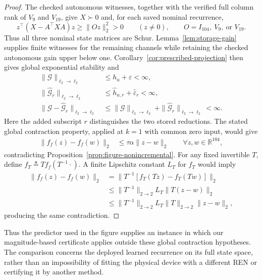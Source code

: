 \documentclass{l4dc2027}
\newcommand{\R}{\mathbb R}
\newcommand{\eqdef}{\triangleq}
\begin{document}
\begin{proof}
The checked autonomous witnesses, together with the verified full column rank of \mbox{$V_9$} and \mbox{$V_{19}$}, give \mbox{$X\succ0$} and, for each saved nominal recurrence,
\[
 z^\top(X-A^\top XA)z\ge\|Oz\|_2^2>0
 \qquad(z\ne0),\qquad O=I_{104},\ V_9,\ \text{or }V_{19}.
\]
Thus all three nominal state matrices are Schur.
Lemma~\ref{lem:storage-gain} supplies finite witnesses for the remaining channels while retaining the checked autonomous gain upper below one.
Corollary~\ref{cor:prescribed-projection} then gives global exponential stability and
\[
 \begin{aligned}
 \|\mathcal G\|_{\ell_2\to\ell_2}&\le h_u+\varepsilon<\infty,\\
 \|\widehat{\mathcal G}_r\|_{\ell_2\to\ell_2}
 &\le\widehat h_{u,r}+\widehat\varepsilon_r<\infty,\\
 \|\mathcal G-\widehat{\mathcal G}_r\|_{\ell_2\to\ell_2}
 &\le\|\mathcal G\|_{\ell_2\to\ell_2}
       +\|\widehat{\mathcal G}_r\|_{\ell_2\to\ell_2}<\infty.
 \end{aligned}
\]
Here the added subscript \mbox{$r$} distinguishes the two stored reductions.
The stated global contraction property, applied at \mbox{$k=1$} with common zero input, would give
\[
 \begin{aligned}
 \|f_f(z)-f_f(w)\|_2&\le\tau\alpha\|z-w\|_2
 \qquad\forall z,w\in\R^{104},
 \end{aligned}
\]
contradicting Proposition~\ref{prop:figure-nonincremental}.
For any fixed invertible \mbox{$T$}, define \mbox{$f_T\eqdef Tf_f(T^{-1}\cdot)$}.
A finite Lipschitz constant \mbox{$L_T$} for \mbox{$f_T$} would imply
\[
 \begin{aligned}
 \|f_f(z)-f_f(w)\|_2
 &=\|T^{-1}[f_T(Tz)-f_T(Tw)]\|_2\\
 &\le\|T^{-1}\|_{2\to2}L_T\|T(z-w)\|_2\\
 &\le\|T^{-1}\|_{2\to2}L_T\|T\|_{2\to2}\|z-w\|_2,
 \end{aligned}
\]
producing the same contradiction.
\end{proof}

Thus the predictor used in the figure supplies an instance in which our magnitude-based certificate applies outside these global contraction hypotheses.
The comparison concerns the deployed learned recurrence on its full state space, rather than an impossibility of fitting the physical device with a different REN or certifying it by another method.
\end{document}

